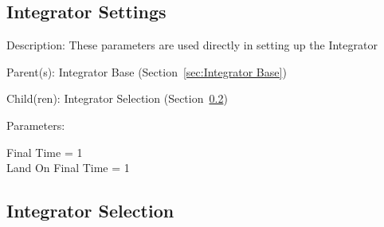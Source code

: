 \subsection{Integrator Settings}
\label{sec:Integrator Settings}

\begin{list}{}
  {\setlength{\leftmargin}{1.0in}
   \setlength{\labelwidth}{0.75in}
   \setlength{\labelsep}{0.125in}}
  \item[Description:]
    These parameters are used directly in setting up the Integrator
  \item[Parent(s):]
    Integrator Base (Section~\ref{sec:Integrator Base})
  \item[Child(ren):]
    Integrator Selection (Section~\ref{sec:Integrator Selection})
  \item[Parameters:]
    \begin{description}
      \item[Final Time = 1] 

      \item[Land On Final Time = 1] 

\end{description}

\end{list}

\subsection{Integrator Selection}
\label{sec:Integrator Selection}

